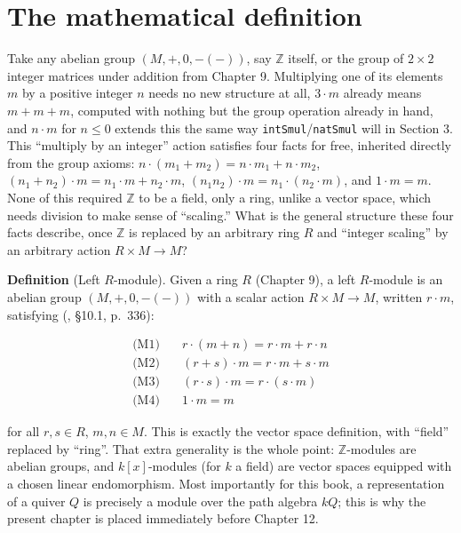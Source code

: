 \section{The mathematical definition}\label{sec:11-modules:01-definition:1}

Take any abelian group \((M, +, 0, -(-))\), say \(\mathbb{Z}\) itself, or the group of \(2\times 2\) integer matrices under addition from Chapter 9. Multiplying one of its elements \(m\) by a positive integer \(n\) needs no new structure at all, \(3 \cdot m\) already means \(m + m + m\), computed with nothing but the group operation already in hand, and \(n \cdot m\) for \(n \le 0\) extends this the same way \texttt{intSmul}/\texttt{natSmul} will in Section 3. This ``multiply by an integer'' action satisfies four facts for free, inherited directly from the group axioms: \(n \cdot (m_1 + m_2) = n\cdot m_1 + n \cdot m_2\), \((n_1+n_2)\cdot m = n_1\cdot m + n_2 \cdot m\), \((n_1 n_2)\cdot m =
n_1\cdot(n_2\cdot m)\), and \(1 \cdot m = m\). None of this required \(\mathbb{Z}\) to be a field, only a ring, unlike a vector space, which needs division to make sense of ``scaling.'' What is the general structure these four facts describe, once \(\mathbb{Z}\) is replaced by an arbitrary ring \(R\) and ``integer scaling'' by an arbitrary action \(R \times M \to M\)?

\textbf{Definition} (Left \(R\)-module). Given a ring \(R\) (Chapter 9), a left \(R\)-module is an abelian group \((M, +, 0, -(-))\) with a scalar action \(R \times M \to M\), written \(r \cdot m\), satisfying (\cite{DummitFoote2003}, §10.1, p.~336):

\[
\begin{aligned}
\text{(M1)}&\quad r \cdot (m + n) = r\cdot m + r \cdot n \\
\text{(M2)}&\quad (r + s) \cdot m = r \cdot m + s \cdot m \\
\text{(M3)}&\quad (r \cdot s) \cdot m = r \cdot (s \cdot m) \\
\text{(M4)}&\quad 1 \cdot m = m
\end{aligned}
\]

for all \(r, s \in R\), \(m, n \in M\). This is exactly the vector space definition, with ``field'' replaced by ``ring''. That extra generality is the whole point: \(\mathbb{Z}\)-modules are abelian groups, and \(k[x]\)-modules (for \(k\) a field) are vector spaces equipped with a chosen linear endomorphism. Most importantly for this book, a representation of a quiver \(Q\) is precisely a module over the path algebra \(kQ\); this is why the present chapter is placed immediately before Chapter 12.

